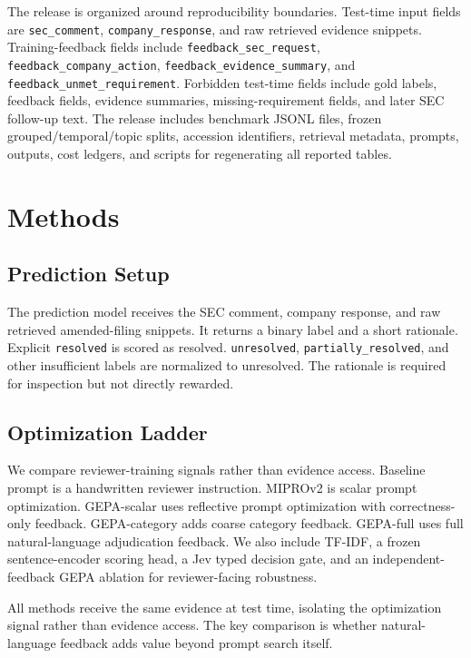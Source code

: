 \documentclass[11pt]{article}
\begin{document}
The release is organized around reproducibility boundaries. Test-time input fields are \texttt{sec\_comment}, \texttt{company\_response}, and raw retrieved evidence snippets. Training-feedback fields include \texttt{feedback\_sec\_request}, \texttt{feedback\_company\_action}, \texttt{feedback\_evidence\_summary}, and \texttt{feedback\_unmet\_requirement}. Forbidden test-time fields include gold labels, feedback fields, evidence summaries, missing-requirement fields, and later SEC follow-up text. The release includes benchmark JSONL files, frozen grouped/temporal/topic splits, accession identifiers, retrieval metadata, prompts, outputs, cost ledgers, and scripts for regenerating all reported tables.

\section{Methods}

\subsection{Prediction Setup}

The prediction model receives the SEC comment, company response, and raw retrieved amended-filing snippets. It returns a binary label and a short rationale. Explicit \texttt{resolved} is scored as resolved. \texttt{unresolved}, \texttt{partially\_resolved}, and other insufficient labels are normalized to unresolved. The rationale is required for inspection but not directly rewarded.

\subsection{Optimization Ladder}

We compare reviewer-training signals rather than evidence access. Baseline prompt is a handwritten reviewer instruction. MIPROv2 is scalar prompt optimization. GEPA-scalar uses reflective prompt optimization with correctness-only feedback. GEPA-category adds coarse category feedback. GEPA-full uses full natural-language adjudication feedback. We also include TF-IDF, a frozen sentence-encoder scoring head, a Jev typed decision gate, and an independent-feedback GEPA ablation for reviewer-facing robustness.

All methods receive the same evidence at test time, isolating the optimization signal rather than evidence access. The key comparison is whether natural-language feedback adds value beyond prompt search itself.
\end{document}
